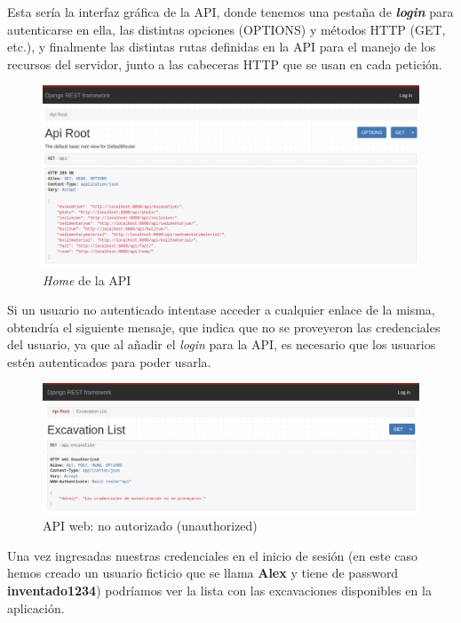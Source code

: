 Esta sería la interfaz gráfica de la API, donde tenemos una pestaña de
\textbf{\textit{login}} para autenticarse en ella, las distintas opciones (OPTIONS) y
métodos HTTP (GET, etc.), y finalmente las distintas rutas definidas en la API para el
manejo de los recursos del servidor, junto a las cabeceras HTTP que se usan en cada petición.

        \begin{figure}[H]
            \centering
            \includegraphics[scale=0.30]{imagenes/root-api.png}
            \caption{\textit{Home} de la API}
            \label{fig:root-api}
        \end{figure}

Si un usuario no autenticado intentase acceder a cualquier enlace de la misma, obtendría el
siguiente mensaje, que indica que no se proveyeron las credenciales del usuario, ya que al
añadir el \textit{login} para la API, es necesario que los usuarios estén autenticados para
poder usarla.

        \begin{figure}[H]
            \centering
            \includegraphics[scale=0.30]{imagenes/unauthorized.png}
            \caption{API web: no autorizado (unauthorized)}
            \label{fig:unauthorized}
        \end{figure}

Una vez ingresadas nuestras credenciales en el inicio de sesión (en este caso hemos creado
un usuario ficticio que se llama \textbf{Alex} y tiene de password \textbf{inventado1234})
podríamos ver la lista con las excavaciones disponibles en la aplicación.

